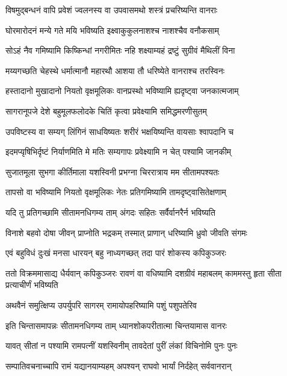 \twolineshloka
{विषमुद्बन्धनं वापि प्रवेशं ज्वलनस्य वा}
{उपवासमथो शस्त्रं प्रचरिष्यन्ति वानराः} %

\twolineshloka
{घोरमारोदनं मन्ये गते मयि भविष्यति}
{इक्ष्वाकुकुलनाशश्च नाशश्चैव वनौकसाम्} %

\twolineshloka
{सोऽहं नैव गमिष्यामि किष्किन्धां नगरीमितः}
{नहि शक्ष्याम्यहं द्रष्टुं सुग्रीवं मैथिलीं विना} %

\twolineshloka
{मय्यगच्छति चेहस्थे धर्मात्मानौ महारथौ}
{आशया तौ धरिष्येते वानराश्च तरस्विनः} %

\twolineshloka
{हस्तादानो मुखादानो नियतो वृक्षमूलिकः}
{वानप्रस्थो भविष्यामि ह्यदृष्ट्वा जनकात्मजाम्} %

\twolineshloka
{सागरानूपजे देशे बहुमूलफलोदके}
{चितिं कृत्वा प्रवेक्ष्यामि समिद्धमरणीसुतम्} %

\twolineshloka
{उपविष्टस्य वा सम्यग् लिंगिनं साधयिष्यतः}
{शरीरं भक्षयिष्यन्ति वायसाः श्वापदानि च} %

\twolineshloka
{इदमप्यृषिभिर्दृष्टं निर्याणमिति मे मतिः}
{सम्यगापः प्रवेक्ष्यामि न चेत् पश्यामि जानकीम्} %

\twolineshloka
{सुजातमूला सुभगा कीर्तिमाला यशस्विनी}
{प्रभग्ना चिररात्राय मम सीतामपश्यतः} %

\twolineshloka
{तापसो वा भविष्यामि नियतो वृक्षमूलिकः}
{नेतः प्रतिगमिष्यामि तामदृष्ट्वासितेक्षणाम्} %

\twolineshloka
{यदि तु प्रतिगच्छामि सीतामनधिगम्य ताम्}
{अंगदः सहितः सर्वैर्वानरैर्न भविष्यति} %

\twolineshloka
{विनाशे बहवो दोषा जीवन् प्राप्नोति भद्रकम्}
{तस्मात् प्राणान् धरिष्यामि ध्रुवो जीवति संगमः} %

\twolineshloka
{एवं बहुविधं दुःखं मनसा धारयन् बहु}
{नाध्यगच्छत् तदा पारं शोकस्य कपिकुञ्जरः} %

\threelineshloka
{ततो विक्रममासाद्य धैर्यवान् कपिकुञ्जरः}
{रावणं वा वधिष्यामि दशग्रीवं महाबलम्}
{काममस्तु हृता सीता प्रत्याचीर्णं भविष्यति} %

\twolineshloka
{अथवैनं समुत्क्षिप्य उपर्युपरि सागरम्}
{रामायोपहरिष्यामि पशुं पशुपतेरिव} %

\twolineshloka
{इति चिन्तासमापन्नः सीतामनधिगम्य ताम्}
{ध्यानशोकपरीतात्मा चिन्तयामास वानरः} %

\twolineshloka
{यावत् सीतां न पश्यामि रामपत्नीं यशस्विनीम्}
{तावदेतां पुरीं लंकां विचिनोमि पुनः पुनः} %

\twolineshloka
{सम्पातिवचनाच्चापि रामं यद्यानयाम्यहम्}
{अपश्यन् राघवो भार्यां निर्दहेत् सर्ववानरान्} %

